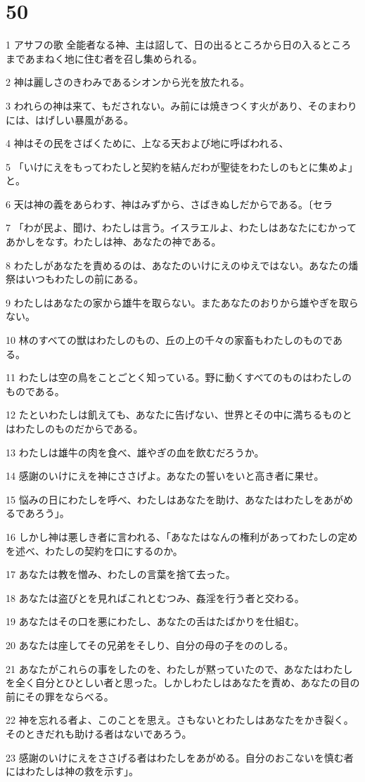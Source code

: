 \chapter{50}

\par 1 アサフの歌 全能者なる神、主は詔して、日の出るところから日の入るところまであまねく地に住む者を召し集められる。
\par 2 神は麗しさのきわみであるシオンから光を放たれる。
\par 3 われらの神は来て、もだされない。み前には焼きつくす火があり、そのまわりには、はげしい暴風がある。
\par 4 神はその民をさばくために、上なる天および地に呼ばわれる、
\par 5 「いけにえをもってわたしと契約を結んだわが聖徒をわたしのもとに集めよ」と。
\par 6 天は神の義をあらわす、神はみずから、さばきぬしだからである。〔セラ
\par 7 「わが民よ、聞け、わたしは言う。イスラエルよ、わたしはあなたにむかってあかしをなす。わたしは神、あなたの神である。
\par 8 わたしがあなたを責めるのは、あなたのいけにえのゆえではない。あなたの燔祭はいつもわたしの前にある。
\par 9 わたしはあなたの家から雄牛を取らない。またあなたのおりから雄やぎを取らない。
\par 10 林のすべての獣はわたしのもの、丘の上の千々の家畜もわたしのものである。
\par 11 わたしは空の鳥をことごとく知っている。野に動くすべてのものはわたしのものである。
\par 12 たといわたしは飢えても、あなたに告げない、世界とその中に満ちるものとはわたしのものだからである。
\par 13 わたしは雄牛の肉を食べ、雄やぎの血を飲むだろうか。
\par 14 感謝のいけにえを神にささげよ。あなたの誓いをいと高き者に果せ。
\par 15 悩みの日にわたしを呼べ、わたしはあなたを助け、あなたはわたしをあがめるであろう」。
\par 16 しかし神は悪しき者に言われる、「あなたはなんの権利があってわたしの定めを述べ、わたしの契約を口にするのか。
\par 17 あなたは教を憎み、わたしの言葉を捨て去った。
\par 18 あなたは盗びとを見ればこれとむつみ、姦淫を行う者と交わる。
\par 19 あなたはその口を悪にわたし、あなたの舌はたばかりを仕組む。
\par 20 あなたは座してその兄弟をそしり、自分の母の子をののしる。
\par 21 あなたがこれらの事をしたのを、わたしが黙っていたので、あなたはわたしを全く自分とひとしい者と思った。しかしわたしはあなたを責め、あなたの目の前にその罪をならべる。
\par 22 神を忘れる者よ、このことを思え。さもないとわたしはあなたをかき裂く。そのときだれも助ける者はないであろう。
\par 23 感謝のいけにえをささげる者はわたしをあがめる。自分のおこないを慎む者にはわたしは神の救を示す」。

